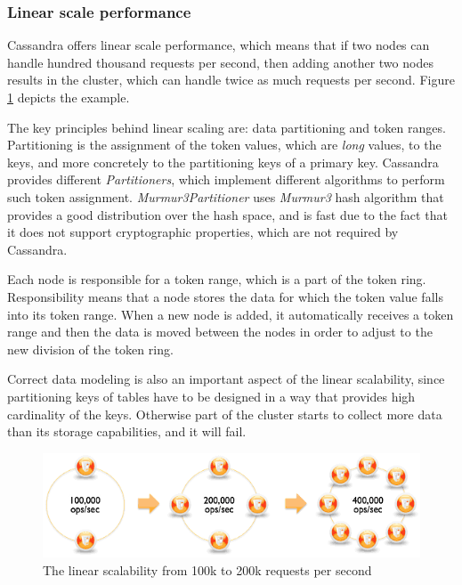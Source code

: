 
\subsubsection{Linear scale performance}
\label{sec:theory:cassandra:linear}
Cassandra offers linear scale performance, which means that if two nodes can handle hundred thousand requests per second, then adding another two nodes results in the cluster, which can handle twice as much requests per second. Figure \ref{fig:archLinearScale} depicts the example.

The key principles behind linear scaling are:  data partitioning and token ranges. 
Partitioning is the assignment of the token values, which are \emph{long} values, to the keys, and more concretely to the partitioning keys of a primary key. Cassandra provides different \emph{Partitioners}, which implement different algorithms to perform such token assignment. \emph{Murmur3Partitioner} uses \emph{Murmur3} hash algorithm that provides a good distribution over the hash space, and is fast due to the fact that it does not support cryptographic properties, which are not required by Cassandra.

Each node is responsible for a token range, which is a part of the token ring. Responsibility means that a node stores the data for which the token value falls into its token range. When a new node is added, it automatically receives a token range and then the data is moved between the nodes in order to adjust to the new division of the token ring.

Correct data modeling is also an important aspect of the linear scalability, since partitioning keys of tables have to be designed in a way that provides high cardinality of the keys. Otherwise part of the cluster starts to collect more data than its storage capabilities, and it will fail. 


\begin{figure}[H]
  \centering  
  \includegraphics[width=\textwidth]{images/cassandra-linear-scalability.png}\hspace{10mm}  
  \caption{The linear scalability from 100k to 200k requests per second}
  \label{fig:archLinearScale}
\end{figure}


